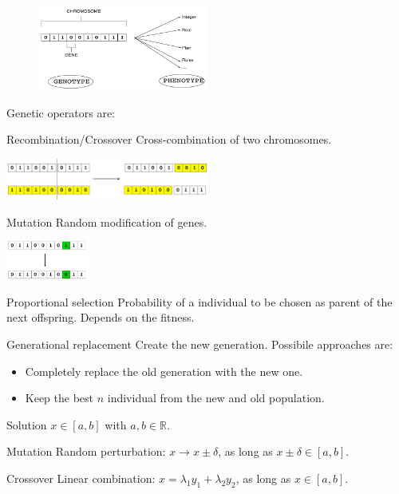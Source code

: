 \begin{figure}[ht]
    \centering
    \includegraphics[width=0.5\textwidth]{img/_genetic_terminology.pdf}
    \caption{}
\end{figure}


Genetic operators are:
\begin{descriptionlist}
    \item[Recombination/Crossover] 
        Cross-combination of two chromosomes.
        \begin{center}
            \includegraphics[width=0.5\textwidth]{img/_genetic_crossover.pdf}
        \end{center}
    \item[Mutation] 
        Random modification of genes.
        \begin{center}
            \includegraphics[width=0.2\textwidth]{img/_genetic_mutation.pdf}
        \end{center}
    \item[Proportional selection] 
        Probability of a individual to be chosen as parent of the next offspring. 
        Depends on the fitness.
    \item[Generational replacement] 
        Create the new generation. Possibile approaches are:
        \begin{itemize}
            \item Completely replace the old generation with the new one.
            \item Keep the best $n$ individual from the new and old population.
        \end{itemize}
\end{descriptionlist}

\begin{example}
    Solution $x \in [a, b]$ with $a, b \in \mathbb{R}$.
    \begin{descriptionlist}
        \item[Mutation] Random perturbation: $x \rightarrow x \pm \delta$, as long as $x \pm \delta \in [a, b]$.
        \item[Crossover] Linear combination: $x = \lambda_1 y_1 + \lambda_2 y_2$, as long as $x \in [a, b]$.
    \end{descriptionlist}
\end{example}

